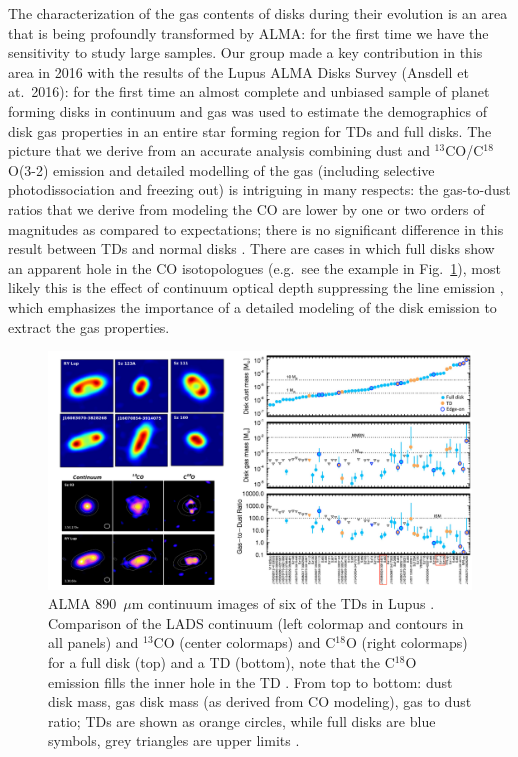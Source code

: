 \documentclass[10pt,fleqn,twoside]{article}
\begin{document}
The characterization of the gas contents of disks during their evolution is an area that is being profoundly transformed by ALMA: for the first time we have the sensitivity to study large samples.
Our group made a key contribution in this area in 2016 with the results of the Lupus ALMA Disks Survey
(Ansdell et at.~2016): for the first time an almost complete and unbiased sample of planet forming disks in continuum and gas was used to estimate the demographics of disk gas properties in an entire star forming region for TDs and full disks. The picture that we derive from an accurate analysis combining dust and $^{13}$CO/C$^{18}$O(3-2) emission and detailed modelling of the gas (including selective photodissociation and freezing out) is intriguing in many respects: the gas-to-dust ratios that we derive from modeling the CO are lower by one or two orders of magnitudes as compared to expectations; there is no significant difference in this result between TDs and normal disks  \citep[see Fig.~\ref{f_LADS};][]{2016ApJ...828...46A,2016arXiv161201538M}. There are cases in which full disks show an apparent hole in the CO isotopologues (e.g.\ see the example in Fig.~\ref{f_LADS}), most likely this is the effect of continuum optical depth suppressing the line emission \citep[see also][]{Isella2016}, which emphasizes the importance of a detailed modeling of the disk emission to extract the gas properties.

\begin{figure}
\centerline{\includegraphics[scale=0.45]{Figure_Lupus_TDs.pdf}}
\caption{ ALMA 890~$\mu$m continuum images
  of six of the TDs in Lupus \citep[LADS survey; adapted from][]{2016ApJ...828...46A}.  Comparison of the LADS
  continuum (left colormap and contours in all panels) and $^{13}$CO (center
  colormaps) and C$^{18}$O (right colormaps) for a full disk (top) and a TD
  (bottom), note that the C$^{18}$O emission fills the inner hole in the TD
  \citep[adapted from][]{2016ApJ...828...46A}.  From top
  to bottom: dust disk mass, gas disk mass (as derived from CO modeling),
  gas to dust ratio; TDs are shown as orange circles, while full disks are
  blue symbols, grey triangles are upper limits \citep[adapted from][]{2016arXiv161201538M}.}
\label{f_LADS}
\end{figure}
\end{document}
